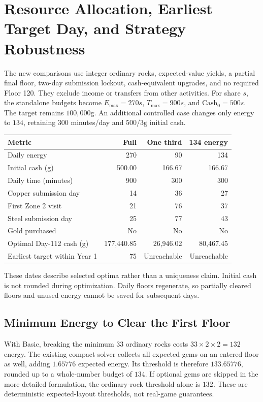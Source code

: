\documentclass[11pt,a4paper]{article}
\begin{document}
\section{Resource Allocation, Earliest Target Day, and Strategy Robustness}
The new comparisons use integer ordinary rocks, expected-value yields, a partial final floor, two-day submission lockout, cash-equivalent upgrades, and no required Floor 120. They exclude income or transfers from other activities. For share $s$, the standalone budgets become $E_{\max}=270s$, $T_{\max}=900s$, and $\mathrm{Cash}_0=500s$. The target remains $100{,}000\mathrm{g}$. An additional controlled case changes only energy to $134$, retaining $300$ minutes/day and $500/3\mathrm{g}$ initial cash.

\begin{center}
\begin{tabular}{lrrr}
\toprule
Metric & Full & One third & 134 energy \\
\midrule
Daily energy & 270 & 90 & 134 \\
Initial cash (g) & 500.00 & 166.67 & 166.67 \\
Daily time (minutes) & 900 & 300 & 300 \\
Copper submission day & 14 & 36 & 27 \\
First Zone 2 visit & 21 & 76 & 37 \\
Steel submission day & 25 & 77 & 43 \\
Gold purchased & No & No & No \\
Optimal Day-112 cash (g) & 177,440.85 & 26,946.02 & 80,467.45 \\
Earliest target within Year 1 & 75 & Unreachable & Unreachable \\
\bottomrule
\end{tabular}
\end{center}
These dates describe selected optima rather than a uniqueness claim. Initial cash is not rounded during optimization. Daily floors regenerate, so partially cleared floors and unused energy cannot be saved for subsequent days.

\subsection{Minimum Energy to Clear the First Floor}
With Basic, breaking the minimum $33$ ordinary rocks costs $33\times2\times2=132$ energy. The existing compact solver collects all expected gems on an entered floor as well, adding $1.65776$ expected energy. Its threshold is therefore $133.65776$, rounded up to a whole-number budget of $134$. If optional gems are skipped in the more detailed formulation, the ordinary-rock threshold alone is $132$. These are deterministic expected-layout thresholds, not real-game guarantees.
\end{document}
